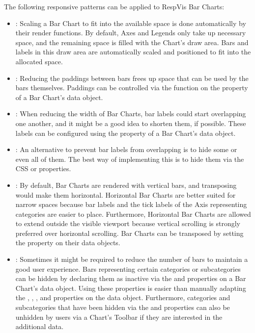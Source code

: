 The following responsive patterns can be applied to RespVis Bar Charts:
\begin{itemize}
\item {}: Scaling a Bar Chart to fit into the
  available space is done automatically by their render functions.  By
  default, Axes and Legends only take up necessary space, and the
  remaining space is filled with the Chart's draw area.  Bars and
  labels in this draw area are automatically scaled and positioned to
  fit into the allocated space.

\item {}: Reducing the paddings between bars
  frees up space that can be used by the bars themselves.  Paddings
  can be controlled via the  function on the
   property of a Bar Chart's data object.

\item {}: When reducing the width of Bar
  Charts, bar labels could start overlapping one another, and it might
  be a good idea to shorten them, if possible.  These labels can be
  configured using the  property of a Bar Chart's data
  object.

\item {}: An alternative to prevent bar
  labels from overlapping is to hide some or even all of them.  The
  best way of implementing this is to hide them via the CSS
   or  properties.

\item {}: By default, Bar Charts are rendered
  with vertical bars, and transposing would make them horizontal.
  Horizontal Bar Charts are better suited for narrow spaces because
  bar labels and the tick labels of the Axis representing categories
  are easier to place.  Furthermore, Horizontal Bar Charts are allowed
  to extend outside the visible viewport because vertical scrolling is
  strongly preferred over horizontal scrolling.  Bar Charts can be
  transposed by setting the  property on their data
  objects.

\item {}: Sometimes it might be required to reduce
  the number of bars to maintain a good user experience.  Bars
  representing certain categories or subcategories can be hidden by
  declaring them as inactive via the  and
   properties on a Bar Chart's data object.
  Using these properties is easier than manually adapting the
  , , , and
   properties on the data object. Furthermore,
  categories and subcategories that have been hidden via the
   and  properties
  can also be unhidden by users via a Chart's Toolbar if they are
  interested in the additional data.


\end{itemize}
